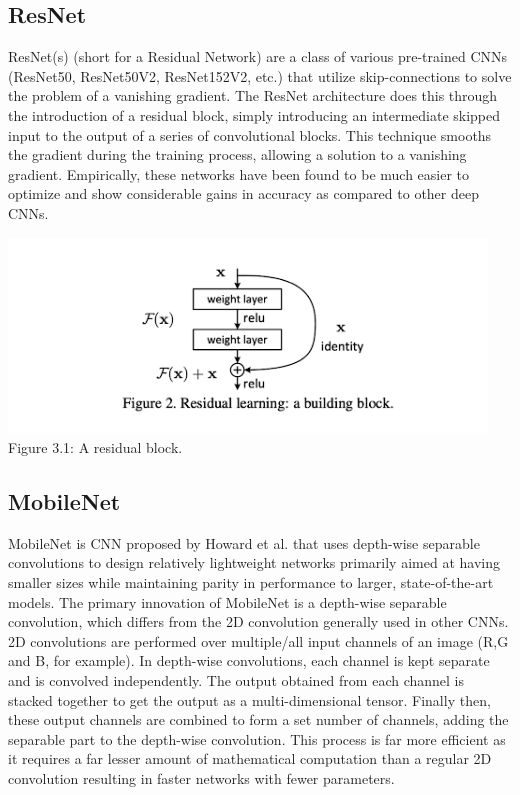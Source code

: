 \subsection{ResNet}
ResNet(s)  \cite{18}  \cite{19} (short for a Residual Network) are a class of various pre-trained CNNs (ResNet50, ResNet50V2, ResNet152V2, etc.) that utilize skip-connections to solve the problem of a vanishing gradient. The ResNet architecture does this through the introduction of a residual block, simply introducing an intermediate skipped input to the output of a series of convolutional blocks. This technique smooths the gradient during the training process, allowing a solution to a vanishing gradient. Empirically, these networks have been found to be much easier to optimize and show considerable gains in accuracy as compared to other deep CNNs.
\begin{center}
   \includegraphics[width=5in]{images/3.1.png} 
   \\\fontsize{11pt}{24pt} Figure 3.1: A residual block.
\end{center}
				

\subsection{MobileNet}
MobileNet is CNN proposed by Howard et al.  \cite{20} that uses depth-wise separable convolutions to design relatively lightweight networks primarily aimed at having smaller sizes while maintaining parity in performance to larger, state-of-the-art models. The primary innovation of MobileNet is a depth-wise separable convolution, which differs from the 2D convolution generally used in other CNNs. 2D convolutions are performed over multiple/all input channels of an image (R,G and B, for example). In depth-wise convolutions, each channel is kept separate and is convolved independently. The output obtained from each channel is stacked together to get the output as a multi-dimensional tensor. Finally then, these output channels are combined to form a set number of channels, adding the separable part to the depth-wise convolution. This process is far more efficient as it requires a far lesser amount of mathematical computation than a regular 2D convolution resulting in faster networks with fewer parameters. 



